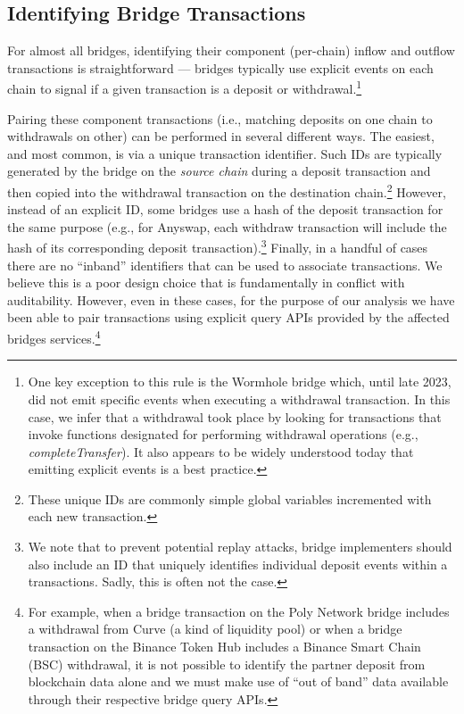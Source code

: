 \subsection{Identifying Bridge Transactions}
For almost all bridges, identifying their component (per-chain) inflow
and outflow transactions is straightforward --- bridges typically use
explicit events on each chain to signal if a given transaction is a
deposit or withdrawal.\footnote{One key exception to this rule is the
  Wormhole bridge which, until late 2023, did not emit specific
  events when executing a withdrawal transaction.  In this case, we infer that a withdrawal took
  place by looking for transactions that invoke functions designated for performing withdrawal operations (e.g., \textit{completeTransfer}).
  It also appears to be widely understood today that emitting
  explicit events is a best practice.}

Pairing these component transactions (i.e., matching deposits on one
chain to withdrawals on other) can be performed in several different
ways.  The easiest, and most common, is via a unique transaction
identifier. Such IDs are typically generated by the bridge on the
\emph{source chain} during a deposit transaction and then copied into
the withdrawal transaction on the destination chain.\footnote{These
  unique IDs are commonly simple global variables incremented with
  each new transaction.}  However, instead of an explicit ID, some
bridges use a hash of the deposit transaction for the same purpose
(e.g., for Anyswap, each withdraw transaction will include the hash of
its corresponding deposit transaction).\footnote{We note that to prevent potential replay attacks, bridge implementers should also include an ID that uniquely identifies individual deposit events within a transactions. Sadly, this is often not the case.}  Finally, in a handful of cases there are
no ``inband'' identifiers that can be used to associate transactions.
We believe this is a poor design choice that is fundamentally in
conflict with auditability.  However, even in these cases, for the
purpose of our analysis we have been able to pair transactions using
explicit query APIs provided by the affected bridges
services.\footnote{For example, when a bridge transaction on the Poly
  Network bridge includes a withdrawal from Curve (a kind of liquidity
  pool) or when a bridge transaction on the Binance Token Hub includes
  a Binance Smart Chain (BSC) withdrawal, it is not possible to
  identify the partner deposit from blockchain data alone and we must
  make use of ``out of band'' data available through their respective
  bridge query APIs.}

